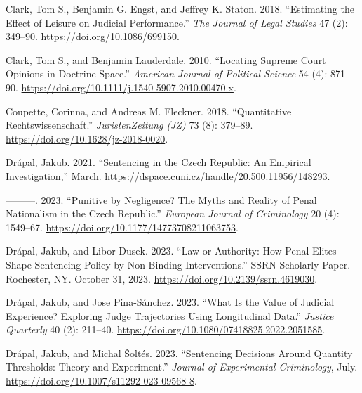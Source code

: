 \documentclass[
  11pt,
]{article}
\newlength{\cslhangindent}
\newenvironment{CSLReferences}[2] %
 {%
  \setlength{\parindent}{0pt}
  \ifodd #1 \everypar{\setlength{\hangindent}{\cslhangindent}}\ignorespaces\fi
  \ifnum #2 > 0
  \setlength{\parskip}{#2\baselineskip}
  \fi
 }%
 {}
\begin{document}
\begin{CSLReferences}{1}{0}
\leavevmode{}%
Clark, Tom S., Benjamin G. Engst, and Jeffrey K. Staton. 2018.
{``Estimating the {Effect} of {Leisure} on {Judicial Performance}.''}
\emph{The Journal of Legal Studies} 47 (2): 349--90.
\url{https://doi.org/10.1086/699150}.

\leavevmode{}%
Clark, Tom S., and Benjamin Lauderdale. 2010. {``Locating {Supreme Court
Opinions} in {Doctrine Space}.''} \emph{American Journal of Political
Science} 54 (4): 871--90.
\url{https://doi.org/10.1111/j.1540-5907.2010.00470.x}.

\leavevmode{}%
Coupette, Corinna, and Andreas M. Fleckner. 2018. {``Quantitative
{Rechtswissenschaft}.''} \emph{JuristenZeitung (JZ)} 73 (8): 379--89.
\url{https://doi.org/10.1628/jz-2018-0020}.

\leavevmode{}%
Drápal, Jakub. 2021. {``Sentencing in the {Czech Republic}: {An
Empirical Investigation},''} March.
\url{https://dspace.cuni.cz/handle/20.500.11956/148293}.

\leavevmode{}%
---------. 2023. {``Punitive by Negligence? {The} Myths and Reality of
Penal Nationalism in the {Czech Republic}.''} \emph{European Journal of
Criminology} 20 (4): 1549--67.
\url{https://doi.org/10.1177/14773708211063753}.

\leavevmode{}%
Drápal, Jakub, and Libor Dusek. 2023. {``Law or {Authority}: {How Penal
Elites Shape Sentencing Policy} by {Non-Binding Interventions}.''} SSRN
Scholarly Paper. {Rochester, NY}. October 31, 2023.
\url{https://doi.org/10.2139/ssrn.4619030}.

\leavevmode{}%
Drápal, Jakub, and Jose Pina-Sánchez. 2023. {``What Is the {Value} of
{Judicial Experience}? {Exploring Judge Trajectories Using Longitudinal
Data}.''} \emph{Justice Quarterly} 40 (2): 211--40.
\url{https://doi.org/10.1080/07418825.2022.2051585}.

\leavevmode{}%
Drápal, Jakub, and Michal Šoltés. 2023. {``Sentencing Decisions Around
Quantity Thresholds: Theory and Experiment.''} \emph{Journal of
Experimental Criminology}, July.
\url{https://doi.org/10.1007/s11292-023-09568-8}.


\end{CSLReferences}
\end{document}
